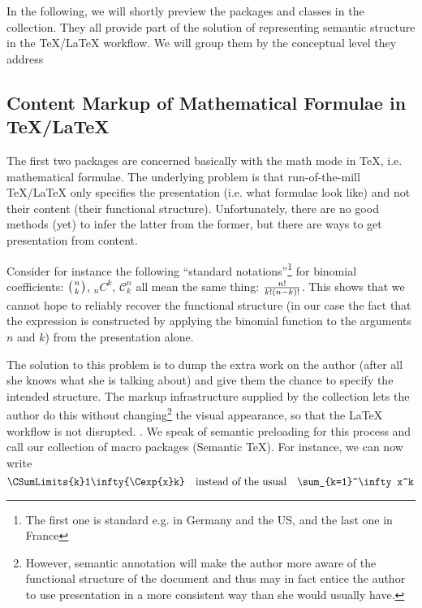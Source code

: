 \documentclass{article}
\def\twin#1#2{\index{#1!#2}\index{#2!#1}}
\def\twintoo#1#2{{#1 #2}\twin{#1}{#2}}
\begin{document}
In the following, we will shortly preview the packages and classes in the {\stex}
collection. They all provide part of the solution of representing semantic structure in
the {\TeX/\LaTeX} workflow. We will group them by the conceptual level they
address

\subsection{Content Markup of Mathematical Formulae in {\TeX/\LaTeX}}

The first two packages are concerned basically with the math mode in {\TeX},
i.e. mathematical formulae. The underlying problem is that run-of-the-mill {\TeX/\LaTeX}
only specifies the presentation (i.e. what formulae look like) and not their content
(their functional structure). Unfortunately, there are no good methods (yet) to infer the
latter from the former, but there are ways to get presentation from content.
 
Consider for instance the following ``standard notations''\footnote{The first one is
  standard e.g. in Germany and the US, and the last one in France} for binomial
coefficients: $\left(n\atop k\right)$, $_nC^k$, $\mathcal{C}^n_k$ all mean the same thing:
$n!\over k!(n-k)!$. This shows that we cannot hope to reliably recover the functional
structure (in our case the fact that the expression is constructed by applying the
binomial function to the arguments $n$ and $k$) from the presentation alone.
 
The solution to this problem is to dump the extra work on the author (after all she knows
what she is talking about) and give them the chance to specify the intended structure. The
markup infrastructure supplied by the {\stex} collection lets the author do this without
changing\footnote{However, semantic annotation will make the author more aware of the
  functional structure of the document and thus may in fact entice the author to use
  presentation in a more consistent way than she would usually have.} the visual
appearance, so that the {\LaTeX} workflow is not disrupted. . We speak of
{\twintoo{semantic}{preloading}} for this process and call our collection of macro
packages {\stex} (Semantic {\TeX}). For instance, we can now write
\begin{equation}\label{eq:cmathml-sum}
  \verb|\CSumLimits{k}1\infty{\Cexp{x}k}| \quad\hbox{instead of the usual}\quad
  \verb|\sum_{k=1}^\infty x^k|
\end{equation}
\end{document}
